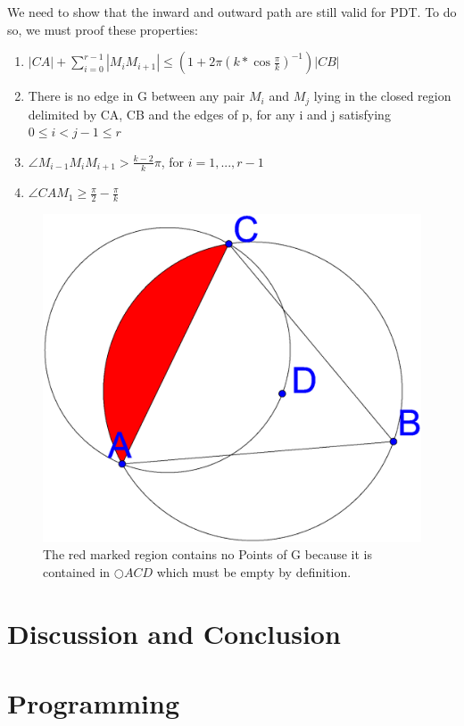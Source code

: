 \documentclass[a4paper,twoside, onecolumn]{IEEEtran}
\begin{document}
We need to show that the inward and outward path are still valid for PDT.
To do so, we must proof these properties:
\begin{enumerate}
\item $|CA| + \sum\nolimits_{i=0}^{r-1} |M_iM_{i+1}| \leq (1+2\pi (k*\cos{\frac{\pi}{k}})^{-1})|CB| $
\item There is no edge in G between any pair $M_i $ and $M_j $ lying in the closed region delimited by CA, CB and the edges of p, for any i and j satisfying $0 \leq i < j-1 \leq r $ 
\item $\angle{M_{i-1}M_iM_{i+1}} > \frac{k-2}{k}\pi $, for $i=1, ..., r-1 $ 
\item $\angle{CAM_1} \geq \frac{\pi}{2}-\frac{\pi}{k} $
\end{enumerate}



\begin{figure}[h!]
\centering
\includegraphics[width=0.2\linewidth]{noPointinRegion.eps}
\caption{The red marked region contains no Points of G because it is contained in $\bigcirc{ACD} $ which must be empty by definition.}
\label{fig:region}
\end{figure}



\section{Discussion and Conclusion}

\section{Programming}



\end{document}
